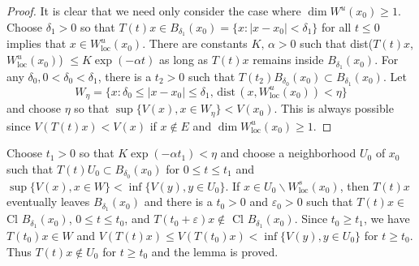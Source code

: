 \documentclass{surv-l}
\theoremstyle{plain}
\theoremstyle{definition}
\numberwithin{equation}{section}
\numberwithin{figure}{chapter}
\begin{document}
\begin{proof} It is clear that we need only consider the case where $\dim W^{u}(x_{0})\geq 1$. Choose $\delta_{1}>0$ so that $T(t)x\in B_{\delta_{1}}(x_{0})=\{x\!:|x-x_{0}|<\delta_{1}\}$ for all $t\leq 0$ implies that $x\in W_{\mathrm{loc}}^{u}(x_{0})$. There are constants $K,\, \alpha>0$ such that dist($T(t)x$, $W_{\mathrm{loc}}^{u}(x_{0})$) $\leq K\exp(-\alpha t)$ as long as $T(t)x$ remains inside $B_{\delta_{1}}(x_{0})$. For any $\delta_{0},0<\delta_{0}<\delta_{1}$, there is a $t_{2}>0$ such that $T(t_{2})B_{\delta_{0}}(x_{0})\subset B_{\delta_{1}}(x_{0})$. Let
\begin{equation*}
W_{\eta}=\{x\!:\delta_{0}\leq|x-x_{0}|\leq\delta_{1},\, \mathrm{dist}\,(x, W_{\mathrm{loc}}^{u}(x_{0}))<\eta\}
\end{equation*}
and choose $\eta$ so that $\displaystyle \sup\{V(x), x\in W_{\eta}\}<V(x_{0})$. This is always possible since $V(T(t)x)<V(x)$ if $x\not\in E$ and $\dim W_{\mathrm{loc}}^{u}(x_{0})\geq 1$.
\end{proof}

Choose $t_{1}>0$ so that $ K\exp(-\alpha t_{1})<\eta$ and choose a neighborhood $U_{0}$ of $x_{0}$ such that $T(t)U_{0}\subset B_{\delta_{0}}(x_{0})$ for $0\leq t\leq t_{1}$ and $\displaystyle \sup\{V(x), x\in W\}< \displaystyle \inf\{V(y),y\in U_{0}\}$. If $x\in U_{0}\backslash W_{\mathrm{loc}}^{s}(x_{0})$, then $T(t)x$ eventually leaves $B_{\delta_{1}}(x_{0})$ and there is a $t_{0}>0$ and $\varepsilon_{0}>0$ such that $ T(t)x\in$ Cl $B_{\delta_{1}}(x_{0})$, $0\leq t\leq t_{0}$, and $T(t_{0}+\varepsilon)x\not\in$ Cl $B_{\delta_{1}}(x_{0})$. Since $t_{0}\geq t_{1}$, we have $T(t_{0})x\in W$ and $ V(T(t)x)\leq V(T(t_{0})x)<\displaystyle \inf\{V(y), y\in U_{0}\}$ for $t\geq t_{0}$. Thus $T(t)x\not\in U_{0}$ for $t\geq t_{0}$ and the lemma is proved.
\end{document}
